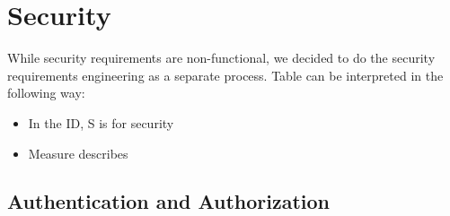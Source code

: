 \section{Security}
While security requirements are non-functional, we decided to do the
security requirements engineering as a separate process. 
Table %
can be interpreted in the following way:
\begin{itemize}
    \item In the ID, S is for security
    \item Measure describes 
\end{itemize}

\subsection{Authentication and Authorization}
